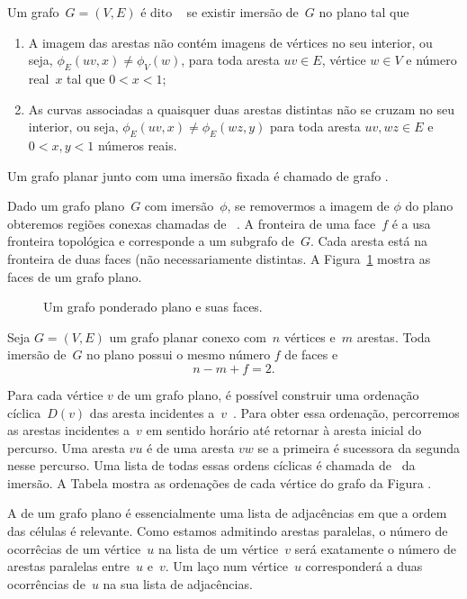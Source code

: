 Um grafo~$G=(V,E)$ é dito ~\cite{noma2003} se existir imersão de~$G$ no plano tal que
\begin{enumerate}
\item A imagem das arestas não contém imagens de vértices no seu interior, ou seja, $\phi_E(uv,x) \neq \phi_V(w)$, para toda aresta $uv\in E$, vértice $w\in V$ e número real~$x$ tal que $0<x<1$;
\item As curvas associadas a quaisquer duas arestas distintas não se cruzam no seu interior, ou seja, $\phi_E(uv,x)\neq \phi_E(wz,y)$ para toda aresta $uv,wz\in E$ e $0<x,y<1$ números reais.
\end{enumerate}
Um grafo planar junto com uma imersão fixada é chamado de grafo .

Dado um grafo plano~$G$ com imersão~$\phi$, se removermos a imagem de $\phi$ do plano obteremos regiões conexas chamadas de ~\cite{planarTheoryAlgorith}.
A fronteira de uma face~$f$ é a usa fronteira topológica e corresponde a um subgrafo de~$G$.
Cada aresta está na fronteira de duas faces (não necessariamente distintas.
A Figura~\ref{fig:MSF-basico-0} mostra as faces de um grafo plano.

\begin{figure}[htb]
\scalebox{1.5}{
\centering

}
\caption{Um grafo ponderado plano e suas faces.}
\label{fig:MSF-basico-0}
\end{figure}

\begin{theorem}
\label{teo:MSFEuler}
Seja $G=(V,E)$ um grafo planar conexo com~$n$ vértices e~$m$ arestas. Toda imersão de~$G$ no plano possui o mesmo número $f$ de faces e
$$
n-m+f = 2.
$$
\end{theorem}

Para cada vértice $v$ de um grafo plano, é possível construir uma ordenação cíclica~$D(v)$ das aresta incidentes a~$v$~\cite{noma2003}.
Para obter essa ordenação, percorremos as arestas incidentes a~$v$ em sentido horário até retornar à aresta inicial do percurso.
Uma aresta $vu$ é  de uma aresta $vw$ se a primeira é sucessora da segunda nesse percurso.
Uma lista de todas essas ordens cíclicas é chamada de~ da imersão.
A Tabela  mostra as ordenações de cada vértice do grafo da Figura .

A  de um grafo plano é essencialmente uma lista de adjacências em que a ordem das células é relevante.
Como estamos admitindo arestas paralelas, o número de ocorrêcias de um vértice~$u$ na lista de um vértice~$v$ será exatamente o número de arestas paralelas entre~$u$ e~$v$.
Um laço num vértice~$u$ corresponderá a duas ocorrências de~$u$ na sua lista de adjacências.

